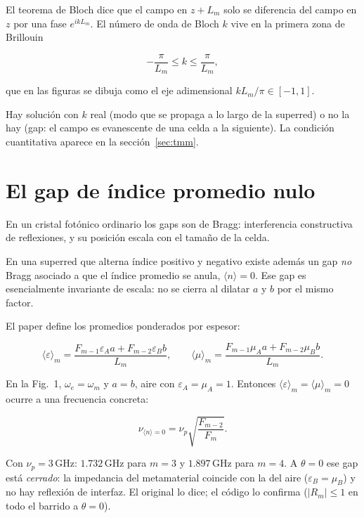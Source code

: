 \documentclass[11pt,a4paper]{article}
\begin{document}
El teorema de Bloch dice que el campo en \(z+L_m\) solo se diferencia del
campo en \(z\) por una fase \(e^{ik L_m}\).
El número de onda de Bloch \(k\) vive en la primera zona de Brillouin

\begin{equation}
-\frac{\pi}{L_m}\le k\le \frac{\pi}{L_m},
\end{equation}

que en las figuras se dibuja como el eje adimensional
\(k L_m/\pi\in[-1,1]\).

Hay solución con \(k\) real (modo que se propaga a lo largo de la superred) o
no la hay (gap: el campo es evanescente de una celda a la siguiente).
La condición cuantitativa aparece en la sección~\ref{sec:tmm}.

\section{El gap de índice promedio nulo}
\label{sec:n0}

En un cristal fotónico ordinario los gaps son de Bragg: interferencia
constructiva de reflexiones, y su posición escala con el tamaño de la celda.

En una superred que alterna índice positivo y negativo existe además un gap
\emph{no} Bragg asociado a que el índice promedio se anula,
\(\langle n\rangle=0\).
Ese gap es esencialmente invariante de escala: no se cierra al dilatar \(a\) y
\(b\) por el mismo factor.

El paper define los promedios ponderados por espesor:

\begin{equation}
\langle\varepsilon\rangle_m
=\frac{F_{m-1}\varepsilon_A a+F_{m-2}\varepsilon_B b}{L_m},\qquad
\langle\mu\rangle_m
=\frac{F_{m-1}\mu_A a+F_{m-2}\mu_B b}{L_m}.
\end{equation}

En la Fig.\ 1, \(\omega_e=\omega_m\) y \(a=b\), aire con \(\varepsilon_A=\mu_A=1\).
Entonces \(\langle\varepsilon\rangle_m=\langle\mu\rangle_m=0\) ocurre a una
frecuencia concreta:

\begin{equation}
\nu_{\langle n\rangle=0}
=\nu_p\sqrt{\frac{F_{m-2}}{F_m}}.
\end{equation}

Con \(\nu_p=3\,\mathrm{GHz}\): \(1.732\,\mathrm{GHz}\) para \(m=3\) y
\(1.897\,\mathrm{GHz}\) para \(m=4\).
A \(\theta=0\) ese gap está \emph{cerrado}: la impedancia del metamaterial
coincide con la del aire (\(\varepsilon_B=\mu_B\)) y no hay reflexión de
interfaz. El original lo dice; el código lo confirma (\(\lvert R_m\rvert\le 1\)
en todo el barrido a \(\theta=0\)).
\end{document}
